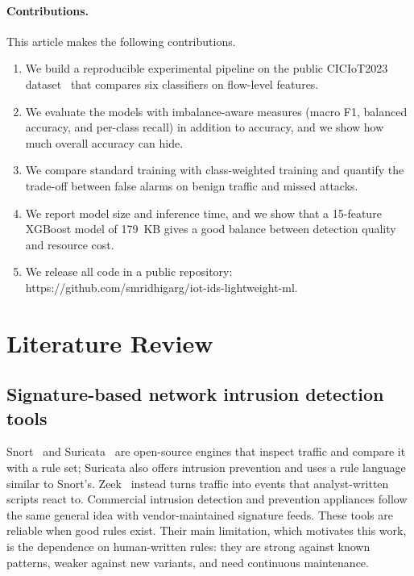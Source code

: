 \documentclass[runningheads]{llncs}
\begin{document}
\paragraph{Contributions.} This article makes the following contributions.
\begin{enumerate}
\item We build a reproducible experimental pipeline on the public CICIoT2023 dataset~\cite{neto2023} that compares six classifiers on flow-level features.
\item We evaluate the models with imbalance-aware measures (macro F1, balanced accuracy, and per-class recall) in addition to accuracy, and we show how much overall accuracy can hide.
\item We compare standard training with class-weighted training and quantify the trade-off between false alarms on benign traffic and missed attacks.
\item We report model size and inference time, and we show that a 15-feature XGBoost model of 179~KB gives a good balance between detection quality and resource cost.
\item We release all code in a public repository: https://github.com/smridhigarg/iot-ids-lightweight-ml.
\end{enumerate}

\section{Literature Review}
\label{sec:lit}

\subsection{Signature-based network intrusion detection tools}
Snort~\cite{roesch1999} and Suricata~\cite{suricata} are open-source engines that inspect traffic and compare it with a rule set; Suricata also offers intrusion prevention and uses a rule language similar to Snort's. Zeek~\cite{paxson1999} instead turns traffic into events that analyst-written scripts react to. Commercial intrusion detection and prevention appliances follow the same general idea with vendor-maintained signature feeds. These tools are reliable when good rules exist. Their main limitation, which motivates this work, is the dependence on human-written rules: they are strong against known patterns, weaker against new variants, and need continuous maintenance.
\end{document}
